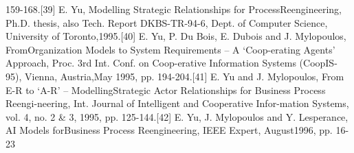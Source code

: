 159-168.[39] E. Yu, Modelling Strategic Relationships for ProcessReengineering, Ph.D. thesis, also Tech. Report DKBS-TR-94-6, Dept. of Computer Science, University of Toronto,1995.[40] E. Yu, P. Du Bois, E. Dubois and J. Mylopoulos, FromOrganization Models to System Requirements – A ‘Coop-erating Agents’ Approach, Proc. 3rd Int. Conf. on Coop-erative Information Systems (CoopIS-95), Vienna, Austria,May 1995, pp. 194-204.[41] E. Yu and J. Mylopoulos, From E-R to ‘A-R’ – ModellingStrategic Actor Relationships for Business Process Reengi-neering, Int. Journal of Intelligent and Cooperative Infor-mation Systems, vol. 4, no. 2 & 3, 1995, pp. 125-144.[42] E. Yu, J. Mylopoulos and Y. Lesperance, AI Models forBusiness Process Reengineering, IEEE Expert, August1996, pp. 16-23